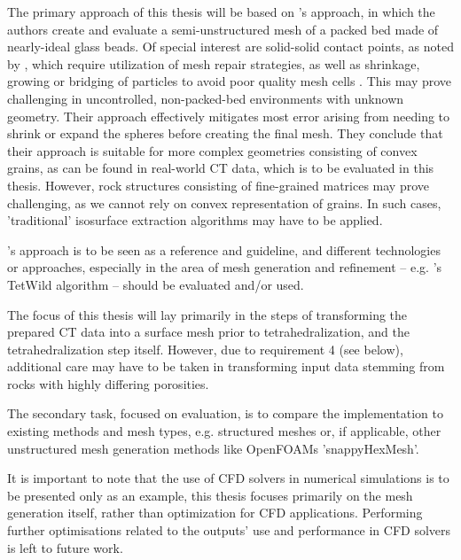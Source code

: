 \documentclass[
	ngerman,
	accentcolor=9c,
	type=intern,
	marginpar=false
	]{tudapub}
\begin{document}
The primary approach of this thesis will be based on \citeauthor{hammouti_error_2024}'s approach, in which the authors create and evaluate a semi-unstructured mesh of a packed bed made of nearly-ideal glass beads. Of special interest are solid-solid contact points, as noted by \textcite{dixon_systematic_2013, hammouti_error_2024}, which require utilization of mesh repair strategies, as well as shrinkage, growing or bridging of particles to avoid poor quality mesh cells \cite{calis_cfd_2001, dixon_systematic_2013, hammouti_error_2024}. This may prove challenging in uncontrolled, non-packed-bed environments with unknown geometry. Their approach effectively mitigates most error arising from needing to shrink or expand the spheres before creating the final mesh. They conclude that their approach is suitable for more complex geometries consisting of convex grains, as can be found in real-world CT data, which is to be evaluated in this thesis. However, rock structures consisting of fine-grained matrices may prove challenging, as we cannot rely on convex representation of grains. In such cases, 'traditional' isosurface extraction algorithms may have to be applied.\par

\citeauthor{hammouti_error_2024}'s approach is to be seen as a reference and guideline, and different technologies or approaches, especially in the area of mesh generation and refinement -- e.g. \citeauthor{hu_fast_2020}'s TetWild algorithm \cite{hu_fast_2020} -- should be evaluated and/or used.\par

The focus of this thesis will lay primarily in the steps of transforming the prepared CT data into a surface mesh prior to tetrahedralization, and the tetrahedralization step itself. However, due to requirement 4 (see below), additional care may have to be taken in transforming input data stemming from rocks with highly differing porosities.\par

The secondary task, focused on evaluation, is to compare the implementation to existing methods and mesh types, e.g. structured meshes or, if applicable, other unstructured mesh generation methods like OpenFOAMs 'snappyHexMesh'.\par

It is important to note that the use of CFD solvers in numerical simulations is to be presented only as an example, this thesis focuses primarily on the mesh generation itself, rather than optimization for CFD applications. Performing further optimisations related to the outputs' use and performance in CFD solvers is left to future work.\par
\end{document}
